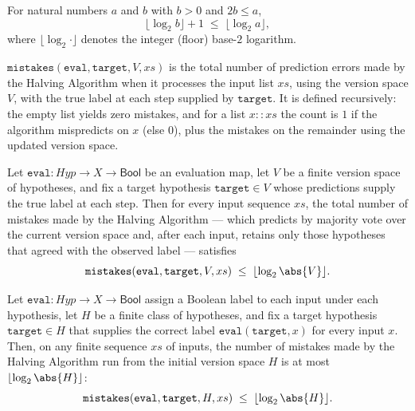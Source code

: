\begin{lemma}
\label{Halving.log_succ_le_log_of_double_le}
\leanok
{}
For natural numbers $a$ and $b$ with $b > 0$ and $2b \le a$,
\[
  \lfloor \log_2 b \rfloor + 1 \;\le\; \lfloor \log_2 a \rfloor,
\]
where $\lfloor \log_2 \cdot \rfloor$ denotes the integer (floor) base-$2$ logarithm.
\end{lemma}

\begin{definition}
\label{Halving.mistakes}
\leanok
{}
$\mathtt{mistakes}(\mathtt{eval}, \mathtt{target}, V, xs)$ is the total number of
prediction errors made by the Halving Algorithm when it processes the input list $xs$,
using the version space $V$, with the true label at each step supplied by
$\mathtt{target}$.  It is defined recursively: the empty list yields zero mistakes, and
for a list $x :: xs$ the count is $1$ if the algorithm mispredicts on $x$ (else $0$),
plus the mistakes on the remainder using the updated version space.
\end{definition}

\begin{theorem}
\label{Halving.mistakes_bound}
\leanok
{}
Let $\mathtt{eval} : \mathit{Hyp} \to X \to \mathsf{Bool}$ be an evaluation map, let $V$
be a finite version space of hypotheses, and fix a target hypothesis $\mathtt{target}
\in V$ whose predictions supply the true label at each step. Then for every input
sequence $xs$, the total number of mistakes made by the Halving Algorithm — which
predicts by majority vote over the current version space and, after each input, retains
only those hypotheses that agreed with the observed label — satisfies
\[
\mathtt{mistakes}(\mathtt{eval}, \mathtt{target}, V, xs) \;\le\; \lfloor \log_2 \abs{V}
\rfloor.
\]
\end{theorem}

\begin{theorem}
\label{Halving.halving_bound}
\leanok
{}
Let $\mathtt{eval} : \mathit{Hyp} \to X \to \mathsf{Bool}$ assign a Boolean label to
each input under each hypothesis, let $H$ be a finite class of hypotheses, and fix a
target hypothesis $\mathtt{target} \in H$ that supplies the correct label
$\mathtt{eval}(\mathtt{target}, x)$ for every input $x$. Then, on any finite sequence
$xs$ of inputs, the number of mistakes made by the Halving Algorithm run from the
initial version space $H$ is at most $\lfloor \log_2 \abs{H} \rfloor$:
\[
\mathtt{mistakes}(\mathtt{eval}, \mathtt{target}, H, xs) \;\le\; \lfloor \log_2 \abs{H}
\rfloor.
\]
\end{theorem}

